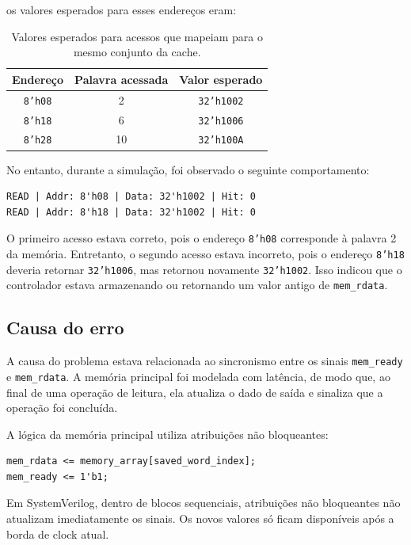 ﻿\documentclass[12pt,a4paper]{article}
\begin{document}
os valores esperados para esses endereços eram:

\begin{table}[h]
\centering
\begin{tabular}{|c|c|c|}
\hline
\textbf{Endereço} & \textbf{Palavra acessada} & \textbf{Valor esperado} \\
\hline
\texttt{8'h08} & 2  & \texttt{32'h1002} \\
\texttt{8'h18} & 6  & \texttt{32'h1006} \\
\texttt{8'h28} & 10 & \texttt{32'h100A} \\
\hline
\end{tabular}
\caption{Valores esperados para acessos que mapeiam para o mesmo conjunto da cache.}
\end{table}

No entanto, durante a simulação, foi observado o seguinte comportamento:

\begin{verbatim}
READ | Addr: 8'h08 | Data: 32'h1002 | Hit: 0
READ | Addr: 8'h18 | Data: 32'h1002 | Hit: 0
\end{verbatim}

O primeiro acesso estava correto, pois o endereço \texttt{8'h08} corresponde à palavra 2 da memória. Entretanto, o segundo acesso estava incorreto, pois o endereço \texttt{8'h18} deveria retornar \texttt{32'h1006}, mas retornou novamente \texttt{32'h1002}. Isso indicou que o controlador estava armazenando ou retornando um valor antigo de \texttt{mem\_rdata}.

\subsection{Causa do erro}

A causa do problema estava relacionada ao sincronismo entre os sinais \texttt{mem\_ready} e \texttt{mem\_rdata}. A memória principal foi modelada com latência, de modo que, ao final de uma operação de leitura, ela atualiza o dado de saída e sinaliza que a operação foi concluída.

A lógica da memória principal utiliza atribuições não bloqueantes:

\begin{verbatim}
mem_rdata <= memory_array[saved_word_index];
mem_ready <= 1'b1;
\end{verbatim}

Em SystemVerilog, dentro de blocos sequenciais, atribuições não bloqueantes não atualizam imediatamente os sinais. Os novos valores só ficam disponíveis após a borda de clock atual.
\end{document}
